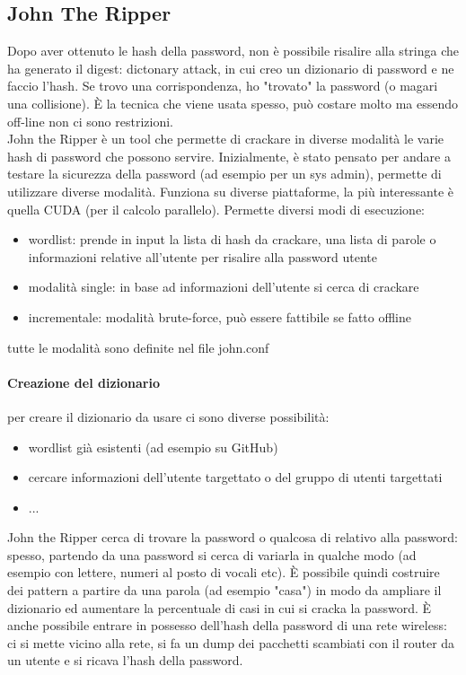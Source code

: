 \documentclass{article}
\begin{document}
\subsection{John The Ripper}
Dopo aver ottenuto le hash della password, non è possibile risalire alla stringa che ha generato il digest: dictonary attack, in cui creo un dizionario di password e ne faccio l'hash. Se trovo una corrispondenza, ho "trovato" la password (o magari una collisione). È la tecnica che viene usata spesso, può costare molto ma essendo off-line non ci sono restrizioni. 
\\ John the Ripper è un tool che permette di crackare in diverse modalità le varie hash di password che possono servire. Inizialmente, è stato pensato per andare a testare la sicurezza della password (ad esempio per un sys admin), permette di utilizzare diverse modalità. Funziona su diverse piattaforme, la più interessante è quella CUDA (per il calcolo parallelo). Permette diversi modi di esecuzione:
\begin{itemize}
\item wordlist: prende in input la lista di hash da crackare, una lista di parole o informazioni relative all'utente per risalire alla password utente
\item modalità single: in base ad informazioni dell'utente si cerca di crackare
\item incrementale: modalità brute-force, può essere fattibile se fatto offline
\end{itemize}
tutte le modalità sono definite nel file john.conf
\paragraph{Creazione del dizionario}per creare il dizionario da usare ci sono diverse possibilità:
\begin{itemize}
\item wordlist già esistenti (ad esempio su GitHub)
\item cercare informazioni dell'utente targettato o del gruppo di utenti targettati
\item ...
\end{itemize}
John the Ripper cerca di trovare la password o qualcosa di relativo alla password: spesso, partendo da una password si cerca di variarla in qualche modo (ad esempio con lettere, numeri al posto di vocali etc). È possibile quindi costruire dei pattern a partire da una parola (ad esempio "casa") in modo da ampliare il dizionario ed aumentare la percentuale di casi in cui si cracka la password. È anche possibile entrare in possesso dell'hash della password di una rete wireless: ci si mette vicino alla rete, si fa un dump dei pacchetti scambiati con il router da un utente e si ricava l'hash della password.
\end{document}

